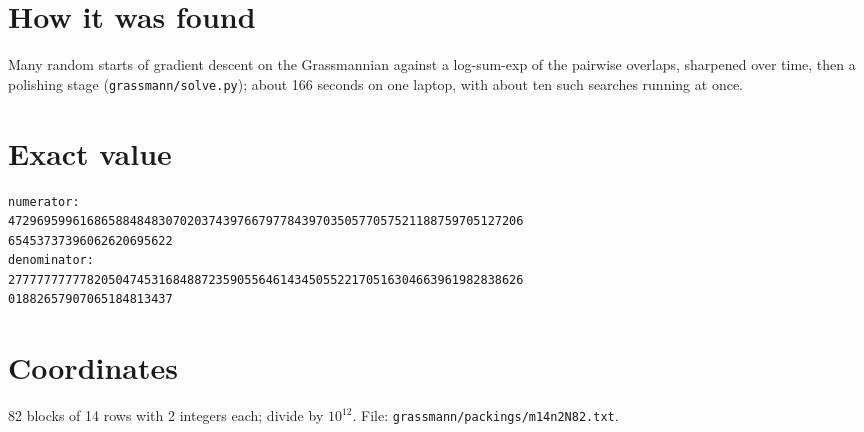 \documentclass[11pt,a4paper]{article}
\begin{document}
\section{How it was found}
Many random starts of gradient descent on the Grassmannian against a log-sum-exp of the pairwise overlaps, sharpened over time, then a polishing stage (\texttt{grassmann/solve.py}); about 166 seconds on one laptop, with about ten such searches running at once.


\appendix
\section{Exact value}
{\small
\begin{verbatim}
numerator:
472969599616865884848307020374397667977843970350577057521188759705127206
65453737396062620695622
denominator:
277777777778205047453168488723590556461434505522170516304663961982838626
01882657907065184813437
\end{verbatim}}

\section{Coordinates}
82 blocks of 14 rows with 2 integers each; divide by $10^{12}$. File: \texttt{grassmann/packings/m14n2N82.txt}.
{\tiny
\begin{multicols}{4}
\end{multicols}}
\end{document}
